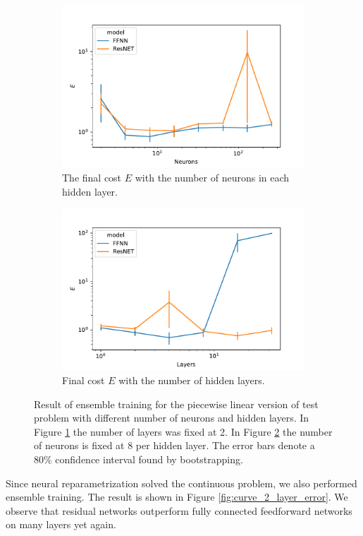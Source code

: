 \begin{figure}[t]
    \begin{subfigure}[t]{0.5\textwidth}
        \centering
        \includegraphics[width=\linewidth]{figures/curve_1_pl/exp_2/neurons_error.pdf}
        \caption{The final cost \(E\) with the number of neurons in each hidden layer.}\label{fig:curve_1_pl_neuron_error}
    \end{subfigure}
    \begin{subfigure}[t]{0.5\textwidth}
        \centering
        \includegraphics[width=\linewidth]{figures/curve_1_pl/exp_2/layer_error.pdf}
        \caption{Final cost \(E\) with the number of hidden layers.}\label{fig:curve_1_pl_layer_error}
    \end{subfigure}
    \caption{Result of ensemble training for the piecewise linear version of test problem with different number of neurons and hidden layers. In Figure \ref{fig:curve_1_pl_neuron_error} the number of layers was fixed at 2. In Figure \ref{fig:curve_1_pl_layer_error} the number of neurons is fixed at 8 per hidden layer. The error bars denote a 80\% confidence interval found by bootstrapping.}\label{fig:curve_1_pl_eks}
\end{figure}

Since neural reparametrization solved the continuous problem, we also performed ensemble training. The result is shown in Figure \ref{fig:curve_2_layer_error}. We observe that residual networks outperform fully connected feedforward networks on many layers yet again.